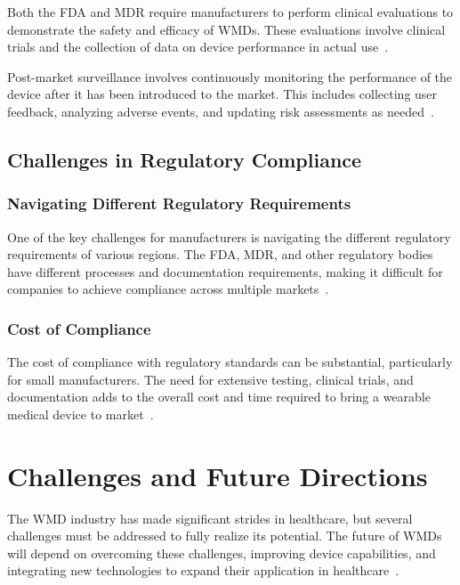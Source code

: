 \documentclass[journal]{IEEEtran}
\begin{document}
        Both the FDA and MDR require manufacturers to perform clinical evaluations to demonstrate the safety and efficacy of WMDs. These evaluations involve clinical trials and the collection of data on device performance in actual use~\cite{Dias2018}.

        Post-market surveillance involves continuously monitoring the performance of the device after it has been introduced to the market. This includes collecting user feedback, analyzing adverse events, and updating risk assessments as needed~\cite{EuropeanUnion2024}.

    \subsection{Challenges in Regulatory Compliance}

        \subsubsection{Navigating Different Regulatory Requirements}

        One of the key challenges for manufacturers is navigating the different regulatory requirements of various regions. The FDA, MDR, and other regulatory bodies have different processes and documentation requirements, making it difficult for companies to achieve compliance across multiple markets~\cite{Ravizza2019,EuropeanUnion2024,FDA2023}.

        \subsubsection{Cost of Compliance}

        The cost of compliance with regulatory standards can be substantial, particularly for small manufacturers. The need for extensive testing, clinical trials, and documentation adds to the overall cost and time required to bring a wearable medical device to market~\cite{Ravizza2019}.

\section{Challenges and Future Directions}
\label{9.Challenges}

The WMD industry has made significant strides in healthcare, but several challenges must be addressed to fully realize its potential. The future of WMDs will depend on overcoming these challenges, improving device capabilities, and integrating new technologies to expand their application in healthcare~\cite{Lu2020, Babu2024}.
\end{document}
